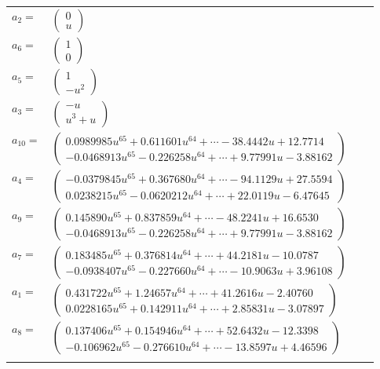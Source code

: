 \documentclass[1p]{elsarticle_modified}
\theoremstyle{definition}
\begin{document}
\begin{tabular}{m{7pt} m{180pt} m{7pt} m{180pt} }
\flushright $a_{2}=$&$\begin{pmatrix}0\\u\end{pmatrix}$ \\
\flushright $a_{6}=$&$\begin{pmatrix}1\\0\end{pmatrix}$ \\
\flushright $a_{5}=$&$\begin{pmatrix}1\\- u^2\end{pmatrix}$ \\
\flushright $a_{3}=$&$\begin{pmatrix}- u\\u^3+u\end{pmatrix}$ \\
\flushright $a_{10}=$&$\begin{pmatrix}0.0989985 u^{65}+0.611601 u^{64}+\cdots-38.4442 u+12.7714\\-0.0468913 u^{65}-0.226258 u^{64}+\cdots+9.77991 u-3.88162\end{pmatrix}$ \\
\flushright $a_{4}=$&$\begin{pmatrix}-0.0379845 u^{65}+0.367680 u^{64}+\cdots-94.1129 u+27.5594\\0.0238215 u^{65}-0.0620212 u^{64}+\cdots+22.0119 u-6.47645\end{pmatrix}$ \\
\flushright $a_{9}=$&$\begin{pmatrix}0.145890 u^{65}+0.837859 u^{64}+\cdots-48.2241 u+16.6530\\-0.0468913 u^{65}-0.226258 u^{64}+\cdots+9.77991 u-3.88162\end{pmatrix}$ \\
\flushright $a_{7}=$&$\begin{pmatrix}0.183485 u^{65}+0.376814 u^{64}+\cdots+44.2181 u-10.0787\\-0.0938407 u^{65}-0.227660 u^{64}+\cdots-10.9063 u+3.96108\end{pmatrix}$ \\
\flushright $a_{1}=$&$\begin{pmatrix}0.431722 u^{65}+1.24657 u^{64}+\cdots+41.2616 u-2.40760\\0.0228165 u^{65}+0.142911 u^{64}+\cdots+2.85831 u-3.07897\end{pmatrix}$ \\
\flushright $a_{8}=$&$\begin{pmatrix}0.137406 u^{65}+0.154946 u^{64}+\cdots+52.6432 u-12.3398\\-0.106962 u^{65}-0.276610 u^{64}+\cdots-13.8597 u+4.46596\end{pmatrix}$\\&\end{tabular}
\end{document}

